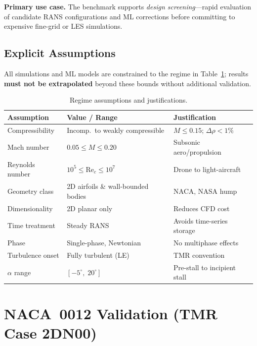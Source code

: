 \documentclass[11pt,a4paper]{article}
\begin{document}
\noindent\textbf{Primary use case.}
The benchmark supports \emph{design screening}---rapid evaluation of candidate
RANS configurations and ML corrections before committing to expensive fine-grid
or LES simulations.

\subsection{Explicit Assumptions}
\label{sec:assumptions}

All simulations and ML models are constrained to the regime in
Table~\ref{tab:assumptions}; results \textbf{must not be extrapolated} beyond
these bounds without additional validation.

\begin{table}[!ht]
\centering
\caption{Regime assumptions and justifications.}
\label{tab:assumptions}
\begin{tabular}{lll}
\toprule
\textbf{Assumption} & \textbf{Value / Range} & \textbf{Justification} \\
\midrule
Compressibility  & Incomp.\ to weakly compressible & $M\le0.15$; $\Delta\rho<1\%$ \\
Mach number      & $0.05\le M\le0.20$ & Subsonic aero/propulsion \\
Reynolds number  & $10^5\le\text{Re}_c\le10^7$ & Drone to light-aircraft \\
Geometry class   & 2D airfoils \& wall-bounded bodies & NACA, NASA hump \\
Dimensionality   & 2D planar only & Reduces CFD cost \\
Time treatment   & Steady RANS & Avoids time-series storage \\
Phase            & Single-phase, Newtonian & No multiphase effects \\
Turbulence onset & Fully turbulent (LE) & TMR convention \\
$\alpha$ range   & $[-5^\circ,\;20^\circ]$ & Pre-stall to incipient stall \\
\bottomrule
\end{tabular}
\end{table}

\section{NACA~0012 Validation (TMR Case 2DN00)}
\label{sec:naca0012}
\end{document}

